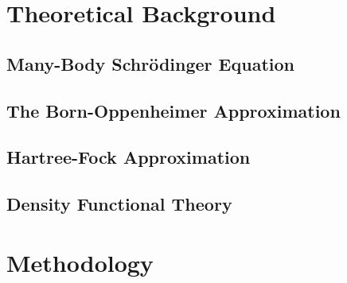 \documentclass[12pt, titlepage, twoside, openright, usernames, dvipsnames]{thesis}
\theoremstyle{definition}
\theoremstyle{definition}
\begin{document}
\chapter{Theoretical Background}\label{Theoretical Background}

\section{Many-Body Schrödinger Equation}\label{Many Body Schrödinger Equation}

\section{The Born-Oppenheimer Approximation}\label{The Born-Oppenheimer Approximation}

\section{Hartree-Fock Approximation}\label{Hartree-Fock Approximation}

\section{Density Functional Theory}\label{Density Functional Theory}



\chapter{Methodology}\label{Methodology}






\printglossary[type=\acronymtype, title={Abbreviations}]
\end{document}
